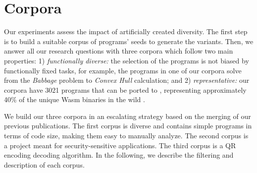 

\section{Corpora}
\label{section:crow:corpora}

Our experiments assess the impact of artificially created diversity. The first step is to build a suitable corpus of programs' seeds to generate the variants. Then, we answer all our research questions with three corpora which follow two main properties: 1) \emph{functionally diverse:} the selection of the programs is not biased by functionally fixed tasks, for example, the programs in one of our corpora solve from the \textit{Babbage} problem to \textit{Convex Hull} calculation; and 2) \emph{representative:} our corpora have 3021 programs that can be ported to \wasm, representing approximately 40\% of the unique Wasm binaries in the wild \cite{Hilbig2021AnES}.


We build our three corpora in an escalating strategy based on the merging of our previous publications. The first corpus is diverse and contains simple programs in terms of code size, making them easy to manually analyze. The second corpus is a project meant for security-sensitive applications. The third corpus is a QR encoding decoding algorithm. 
In the following, we describe the filtering and description of each corpus.

